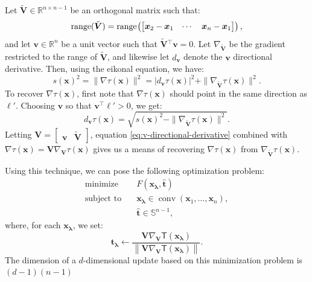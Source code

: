 \documentclass{siamart190516}
\newcommand{\m}[1]{\boldsymbol{#1}}
\newcommand{\xlam}{\m{x}_{\m{\lambda}}}
\newcommand{\that}{\hat{\m{t}}}
\newcommand{\tlam}{\m{t}_{\m{\lambda}}}
\newcommand{\mell}{\m{\ell}}
\DeclareMathOperator{\conv}{conv}
\DeclareMathOperator{\range}{range}
\begin{document}
Let $\tilde{\m{V}} \in \mathbb{R}^{n \times n-1}$ be an orthogonal matrix such
that:
\begin{equation}
  \range(\tilde{\m{V}}) = \range\hspace{-0.1em}\left(\begin{bmatrix} \m{x}_2 - \m{x}_1 & \cdots & \m{x}_n - \m{x}_1 \end{bmatrix}\right),
\end{equation}
and let $\m{v} \in \mathbb{R}^n$ be
a unit vector such that $\tilde{\m{V}}{}^\top \m{v} = 0$. Let $\nabla_{\tilde{\m{V}}}$
be the gradient restricted to the range of $\tilde{\m{V}}$, and likewise let
$d_{\m{v}}$ denote the $\m{v}$ directional derivative. Then, using the
eikonal equation, we have:
\begin{equation}
  s(\m{x})^2 = \|\nabla\tau(\m{x})\|^2 = |d_{\m{v}}\tau(\m{x})|^2 + \|\nabla_{\tilde{\m{V}}}\tau(\m{x})\|^2.
\end{equation}
To recover $\nabla \tau(\m{x})$, first note that $\nabla \tau(\m{x})$
should point in the same direction as $\mell'$. Choosing $\m{v}$ so
that $\m{v}^\top \mell' > 0$, we get:
\begin{equation}\label{eq:v-directional-derivative}
  d_{\m{v}}\tau(\m{x}) = \sqrt{s(\m{x})^2 - \|\nabla_{\tilde{\m{V}}} \tau(\m{x})\|^2}.
\end{equation}
Letting $\m{V} = \begin{bmatrix} \m{v} & \tilde{\m{V}} \end{bmatrix}$,
equation \eqref{eq:v-directional-derivative} combined with
$\nabla \tau(\m{x}) = \m{V} \nabla_{\m{V}} \tau(\m{x})$ gives us
a means of recovering $\nabla\tau(\m{x})$ from
$\nabla_{\tilde{\m{V}}} \tau(\m{x})$.


Using this technique, we can pose the following optimization problem:
\begin{equation}\label{eq:minimization-problem-2}
  \begin{split}
    \mbox{minimize} &\quad F(\xlam, \that) \\
    \mbox{subject to} &\quad \xlam \in \conv(\m{x}_1, \hdots, \m{x}_n), \\
    &\quad \that \in \mathbb{S}^{n-1},
  \end{split}
\end{equation}
where, for each $\xlam$, we set:
\begin{equation}
  \tlam \gets \frac{\m{V} \nabla_{\m{V}} \mathsf{T}(\xlam)}{\left\|\m{V} \nabla_{\m{V}} \mathsf{T}(\xlam)\right\|}.
\end{equation}
The dimension of a $d$-dimensional update based on this minimization
problem is $(d - 1)(n - 1)$
\end{document}

